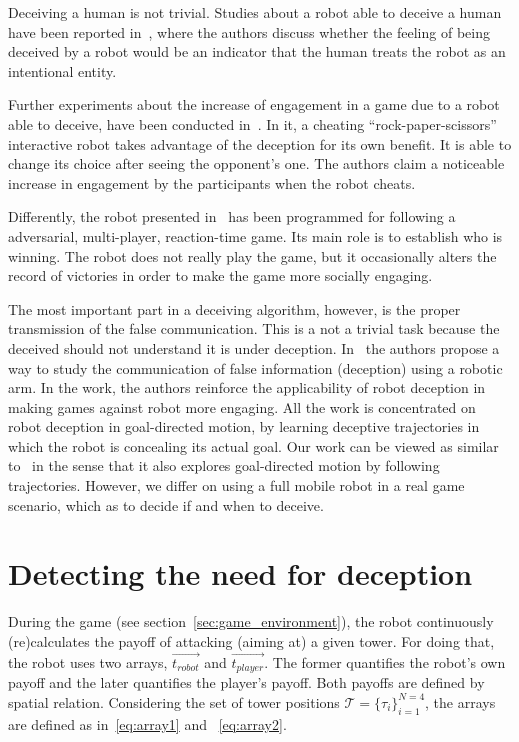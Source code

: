 Deceiving a human is not trivial. Studies about a robot able to deceive a human have been reported in~\cite{terada_can_2010}, where the authors discuss whether the feeling of being deceived by a robot would be an indicator that the human treats the robot as an intentional entity. 

Further experiments about the increase of engagement in a game due to a robot able to deceive, have been conducted in~\cite{short_no_2010}. In it, a cheating ``rock-paper-scissors'' interactive robot takes advantage of the deception for its own benefit. It is able to change its choice after seeing the opponent's one. The authors claim a noticeable increase in engagement by the participants when the robot cheats.

Differently, the robot presented in~\cite{vazquez_deceptive_2011} has been programmed for following a adversarial, multi-player, reaction-time game. Its main role is to establish who is winning. The robot does not really play the game, but it occasionally alters the record of victories in order to make the game more socially engaging.

The most important part in a deceiving algorithm, however, is the proper transmission of the false communication. This is a not a trivial task because the deceived should not understand it is under deception. In~\cite{dragan_analysis_2014} the authors propose a way to study the communication of false information (deception) using a robotic arm. In the work, the authors reinforce the applicability of robot deception in making games against robot more engaging. All the work is concentrated on robot deception in goal-directed motion, by learning deceptive trajectories in which the robot is concealing its actual goal. Our work can be viewed as similar to~\cite{dragan_analysis_2014} in the sense that it also explores goal-directed motion by following trajectories. However, we differ on using a full mobile robot in a real game scenario, which as to decide if and when to deceive. 

\section{Detecting the need for deception}\label{sec:deception_detecting_it}
During the game (see section~\ref{sec:game_environment}), the robot continuously (re)calculates the payoff of attacking (aiming at) a given tower. For doing that, the robot uses two arrays, $\overrightarrow{t_{robot}}$ and $\overrightarrow{t_{player}}$. The former quantifies the robot's own payoff and the later quantifies the player's payoff. Both payoffs are defined by spatial relation. Considering the set of tower positions $\mathcal{T} = \{\tau_{i}\}_{i=1}^{N=4}$, the arrays are defined as in~\ref{eq:array1} and ~\ref{eq:array2}.

